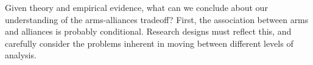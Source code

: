 \documentclass[12pt]{article}
\begin{document}
Given theory and empirical evidence, what can we conclude about our understanding of the arms-alliances tradeoff? First, the association between arms and alliances is probably conditional. Research designs must reflect this, and carefully consider the problems inherent in moving between different levels of analysis. 







  
% 
\end{document}
